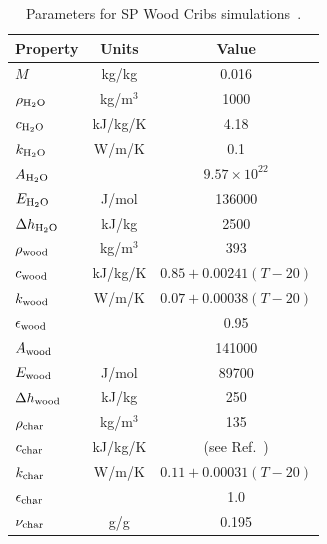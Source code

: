 \begin{table}[!ht]
\caption[Parameters for SP Wood Cribs simulations]{Parameters for SP Wood Cribs simulations~\cite{Janardhan:FSJ2021}.}
\begin{center}
\begin{tabular}{|l|c|c|}
\hline
Property                &      Units    &      Value                           \\ \hline \hline
$M$                     &    kg/kg      & 0.016                                \\ \hline
$\rho_{\rm H_2O}$       &     kg/m$^3$  & 1000                                 \\ \hline
$c_{\rm H_2O}$          &    kJ/kg/K    & 4.18                                 \\ \hline
$k_{\rm H_2O}$          &      W/m/K    & 0.1                                  \\ \hline
$A_{\rm H_2O}$          &               & $9.57 \times 10^{22}$                \\ \hline
$E_{\rm H_2O}$          & J/mol         & 136000                               \\ \hline
$\Delta h_{\rm H_2O}$   & kJ/kg         & 2500                                 \\ \hline \hline
$\rho_{\rm wood}$       &     kg/m$^3$  & 393                                  \\ \hline
$c_{\rm wood}$          &    kJ/kg/K    & $0.85+0.00241(T-20)$                 \\ \hline
$k_{\rm wood}$          &      W/m/K    & $0.07+0.00038(T-20)$                 \\ \hline
$\epsilon_{\rm wood}$   &               & 0.95                                 \\ \hline
$A_{\rm wood}$          &               & 141000                               \\ \hline
$E_{\rm wood}$          & J/mol         & 89700                                \\ \hline
$\Delta h_{\rm wood}$   & kJ/kg         & 250                                  \\ \hline \hline
$\rho_{\rm char}$       &     kg/m$^3$  & 135                                  \\ \hline
$c_{\rm char}$          &    kJ/kg/K    & (see Ref.~\cite{Janardhan:FSJ2021})  \\ \hline
$k_{\rm char}$          &      W/m/K    & $0.11+0.00031(T-20)$                 \\ \hline
$\epsilon_{\rm char}$   &               & 1.0                                  \\ \hline
$\nu_{\rm char}$        & g/g           & 0.195                                \\ \hline
\end{tabular}
\end{center}
\label{Pine_Properties}
\end{table}


